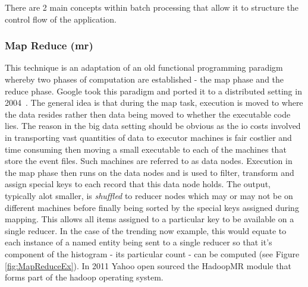 \documentclass[a4paper,11pt]{scrreprt}
\begin{document}
There are 2 main concepts within batch processing that allow it to structure the control flow of the application.

\subsubsection{Map Reduce (\acrshort{mr})}
This technique is an adaptation of an old functional programming paradigm whereby two phases of computation are established - the map phase and the reduce phase. Google took this paradigm and ported it to a distributed setting in 2004~\cite{mapreduce}. The general idea is that during the map task, execution is moved to where the data resides rather then data being moved to whether the executable code lies. The reason in the big data setting should be obvious as the \acrshort{io} costs involved in transporting vast quantities of data to executor machines is fair costlier and time consuming then moving a small executable to each of the machines that store the event files. Such machines are referred to as data nodes. Execution in the map phase then runs on the data nodes and is used to filter, transform and assign special keys to each record that this data node holds. The output, typically alot smaller, is \textit{shuffled} to reducer nodes which may or may not be on different machines before finally being sorted by the special keys assigned during mapping. This allows all items assigned to a particular key to be available on a single reducer. In the case of the trending now example, this would equate to each instance of a named entity being sent to a single reducer so that it's component of the histogram - its particular count - can be computed (see Figure \ref{fig:MapReduceEx}). In 2011 Yahoo open sourced the HadoopMR\autocite{hadoopMR} module that forms part of the hadoop operating system.\\
\end{document}

